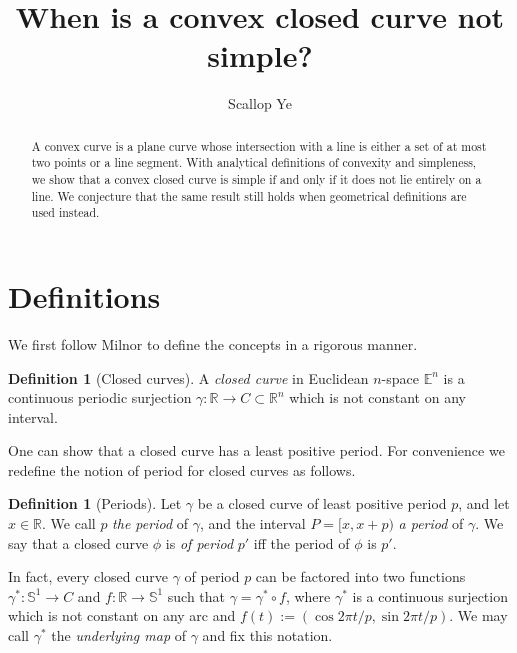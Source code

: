 \documentclass{amsart}
\title{When is a convex closed curve not simple?}
\author{Scallop Ye}
\theoremstyle{definition}
\newtheorem{definition}[proposition]{Definition}
\theoremstyle{remark}
\begin{document}
\begin{abstract}
    A convex curve is a plane curve whose intersection with a
    line is either a set of at most two points or a line segment.
    With analytical definitions of convexity and simpleness,
    we show that a convex closed curve is simple
    if and only if it does not lie entirely on a line.
    We conjecture that the same result still holds when
    geometrical definitions are used instead.
\end{abstract}

\maketitle

\section{Definitions}

We first follow Milnor \cite{milnor} to define the concepts in a rigorous manner.

\begin{definition}[Closed curves]
    \label{def:closed_curves}
    A \emph{closed curve} in Euclidean $n$-space $\mathbb{E}^n$ is a
    continuous periodic surjection $\gamma:\mathbb{R}\to C\subset\mathbb{R}^n$
    which is not constant on any interval.
\end{definition}

One can show that a closed curve has a least positive period.
For convenience we redefine the notion of period for closed curves
as follows.

\begin{definition}[Periods]
    \label{def:periods}
    Let $\gamma$ be a closed curve of least positive period $p$,
    and let $x\in\mathbb{R}$. We call $p$ \emph{the period} of $\gamma$,
    and the interval $P=[x,x+p)$ \emph{a period} of $\gamma$.
    We say that a closed curve $\phi$ is \emph{of period} $p'$
    iff the period of $\phi$ is $p'$.
\end{definition}

In fact, every closed curve $\gamma$ of period $p$
can be factored into two functions
$\gamma^*:\mathbb{S}^1\to C$ and
$f:\mathbb{R}\to\mathbb{S}^1$ such that $\gamma=\gamma^*\circ f$,
where $\gamma^*$ is a continuous surjection which is not constant
on any arc and $f(t):=(\cos 2\pi t/p,\sin 2\pi t/p)$.
We may call $\gamma^*$ the \emph{underlying map} of $\gamma$
and fix this notation.
\end{document}
